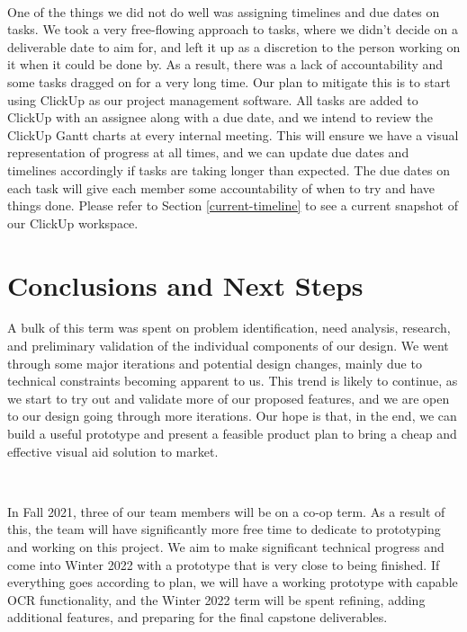 \documentclass[a4paper,11pt]{article}
\begin{document}
\

\noindent
One of the things we did not do well was assigning timelines and due dates on tasks. We took a very free-flowing approach to tasks, where we didn't decide on a deliverable date to aim for, and left it up as a discretion to the person working on it when it could be done by. As a result, there was a lack of accountability and some tasks dragged on for a very long time. Our plan to mitigate this is to start using ClickUp as our project management software. All tasks are added to ClickUp with an assignee along with a due date, and we intend to review the ClickUp Gantt charts at every internal meeting. This will ensure we have a visual representation of progress at all times, and we can update due dates and timelines accordingly if tasks are taking longer than expected. The due dates on each task will give each member some accountability of when to try and have things done. Please refer to Section \ref{current-timeline} to see a current snapshot of our ClickUp workspace.

\section{Conclusions and Next Steps}
A bulk of this term was spent on problem identification, need analysis, research, and preliminary validation of the individual components of our design. We went through some major iterations and potential design changes, mainly due to technical constraints becoming apparent to us. This trend is likely to continue, as we start to try out and validate more of our proposed features, and we are open to our design going through more iterations. Our hope is that, in the end, we can build a useful prototype and present a feasible product plan to bring a cheap and effective visual aid solution to market.

\

\noindent
In Fall 2021, three of our team members will be on a co-op term. As a result of this, the team will have significantly more free time to dedicate to prototyping and working on this project. We aim to make significant technical progress and come into Winter 2022 with a prototype that is very close to being finished. If everything goes according to plan, we will have a working prototype with capable OCR functionality, and the Winter 2022 term will be spent refining, adding additional features, and preparing for the final capstone deliverables.


\end{document}
